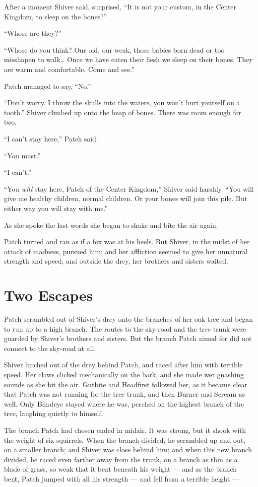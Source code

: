 \documentclass[12pt]{memoir}
\begin{document}
After a moment Shiver said, surprised, “It is not your custom, in the
Center Kingdom, to sleep on the bones?”

“Whose are they?”

“Whose do you think? Our old, our weak, those babies born dead or too
misshapen to walk… Once we have eaten their flesh we sleep on their
bones. They are warm and comfortable. Come and see.”

Patch managed to say, “No.”

“Don’t worry. I throw the skulls into the waters, you won’t hurt
yourself on a tooth.” Shiver climbed up onto the heap of bones. There
was room enough for two.

“I can’t stay here,” Patch said.

“You must.”

“I can’t.”

“You \textit{will} stay here, Patch of the Center Kingdom,” Shiver
said harshly. “You will give me healthy children, normal children. Or
your bones will join this pile. But either way you will stay with me.”

As she spoke the last words she began to shake and bite the air again.

Patch turned and ran as if a fox was at his heels. But Shiver, in the
midst of her attack of madness, pursued him; and her affliction seemed
to give her unnatural strength and speed; and outside the drey, her
brothers and sisters waited.


\section{Two Escapes}

Patch scrambled out of Shiver’s drey onto the branches of her oak tree
and began to run up to a high branch. The routes to the sky-road and
the tree trunk were guarded by Shiver’s brothers and sisters. But the
branch Patch aimed for did not connect to the sky-road at all.

Shiver lurched out of the drey behind Patch, and raced after him with
terrible speed. Her claws clicked mechanically on the bark, and she
made wet gnashing sounds as she bit the air. Gutbite and Headfirst
followed her, as it became clear that Patch was not running for the
tree trunk, and then Burner and Scream as well. Only Blindeye stayed
where he was, perched on the highest branch of the tree, laughing
quietly to himself.

The branch Patch had chosen ended in midair. It was strong, but it
shook with the weight of six squirrels. When the branch divided, he
scrambled up and out, on a smaller branch; and Shiver was close behind
him; and when this new branch divided, he raced even farther away from
the trunk, on a branch as thin as a blade of grass, so weak that it
bent beneath his weight — and as the branch bent, Patch jumped with
all his strength — and fell from a terrible height —
\end{document}

